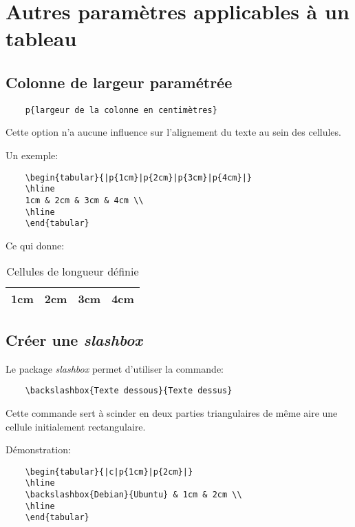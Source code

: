 \section{Autres paramètres applicables à un tableau}
\subsection*{Colonne de largeur paramétrée}
\begin{verbatim}
    p{largeur de la colonne en centimètres}
\end{verbatim}
\medskip

Cette option n'a aucune influence sur l'alignement du texte au sein des cellules.
\medskip

Un exemple:
\begin{verbatim}
    \begin{tabular}{|p{1cm}|p{2cm}|p{3cm}|p{4cm}|}
    \hline
    1cm & 2cm & 3cm & 4cm \\
    \hline
    \end{tabular}
\end{verbatim}
\medskip

Ce qui donne:
\begin{table}[!h]
\begin{center}
\begin{tabular}{|p{1cm}|p{2cm}|p{3cm}|p{4cm}|}
    \hline
    1cm & 2cm & 3cm & 4cm \\
    \hline
\end{tabular}
\caption{Cellules de longueur définie}
\end{center}
\end{table}
\medskip

\subsection*{Créer une \textit{slashbox}}
Le package \textit{slashbox} permet d'utiliser la commande:
\begin{verbatim}
    \backslashbox{Texte dessous}{Texte dessus}
\end{verbatim}
\medskip

Cette commande sert à scinder en deux parties triangulaires de même aire une cellule initialement rectangulaire.
\medskip

Démonstration:
\begin{verbatim}
    \begin{tabular}{|c|p{1cm}|p{2cm}|}
    \hline
    \backslashbox{Debian}{Ubuntu} & 1cm & 2cm \\
    \hline
    \end{tabular}
\end{verbatim}
\medskip


